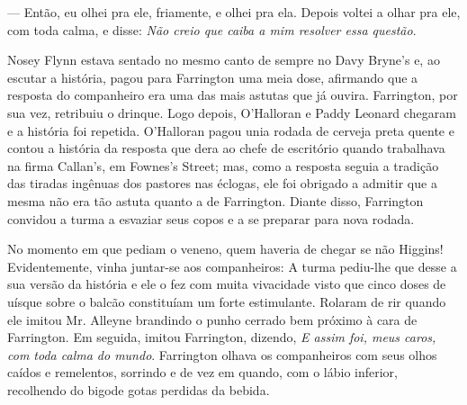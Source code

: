 --- Então, eu olhei pra ele, friamente, e olhei pra ela. Depois voltei
a olhar pra ele, com toda calma, e disse: \textit{Não creio que caiba a mim
resolver essa questão}.

Nosey Flynn estava sentado no mesmo canto de sempre no Davy Bryne's e,
ao escutar a história, pagou para Farrington uma meia dose, afirmando
que a resposta do companheiro era uma das mais astutas que já ouvira.
Farrington, por sua vez, retribuiu o drinque. Logo depois, O'Halloran
e Paddy Leonard chegaram e a
história foi repetida. O'Halloran pagou unia rodada de cerveja preta
quente e contou a história da resposta que dera ao chefe de escritório
quando trabalhava na firma Callan's, em Fownes's Street; mas, como a
resposta seguia a tradição das tiradas ingênuas dos pastores nas
éclogas, ele foi obrigado a admitir que a mesma não era tão astuta
quanto a de Farrington. Diante disso, Farrington convidou a turma a
esvaziar seus copos e a se preparar para nova rodada.

No momento em que pediam o veneno, quem haveria de chegar se não
Higgins! Evidentemente, vinha juntar-se aos companheiros: A turma
pediu-lhe que desse a sua versão da história e ele o fez com muita
vivacidade visto que cinco doses de uísque sobre o balcão constituíam
um forte estimulante. Rolaram de rir quando ele imitou Mr. Alleyne
brandindo o punho cerrado bem próximo à cara de Farrington. Em
seguida, imitou Farrington, dizendo, \textit{E assim foi, meus caros, com toda
calma do mundo}. Farrington olhava os companheiros com seus olhos
caídos e remelentos, sorrindo e de vez em quando, com o lábio
inferior, recolhendo do bigode gotas perdidas da bebida.

